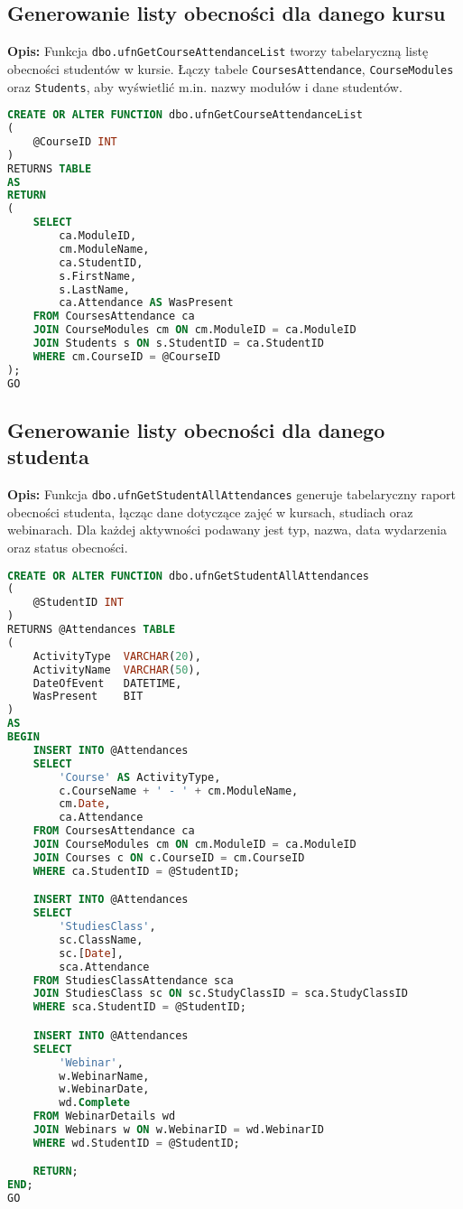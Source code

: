 \documentclass[12pt]{article}
\begin{document}
\subsection{Generowanie listy obecności dla danego kursu}
\label{sec:course_attendance_list}

\textbf{Opis:} Funkcja \texttt{dbo.ufnGetCourseAttendanceList} tworzy tabelaryczną listę obecności studentów w kursie. Łączy tabele \texttt{CoursesAttendance}, \texttt{CourseModules} oraz \texttt{Students}, aby wyświetlić m.in. nazwy modułów i dane studentów.

 
\begin{lstlisting}[language=SQL]
CREATE OR ALTER FUNCTION dbo.ufnGetCourseAttendanceList
(
    @CourseID INT
)
RETURNS TABLE
AS
RETURN
(
    SELECT 
        ca.ModuleID,
        cm.ModuleName,
        ca.StudentID,
        s.FirstName,
        s.LastName,
        ca.Attendance AS WasPresent
    FROM CoursesAttendance ca
    JOIN CourseModules cm ON cm.ModuleID = ca.ModuleID
    JOIN Students s ON s.StudentID = ca.StudentID
    WHERE cm.CourseID = @CourseID
);
GO
\end{lstlisting}
\newpage
\subsection{Generowanie listy obecności dla danego studenta}
\label{sec:student_all_attendances}

\textbf{Opis:} Funkcja \texttt{dbo.ufnGetStudentAllAttendances} generuje tabelaryczny raport obecności studenta, łącząc dane dotyczące zajęć w kursach, studiach oraz webinarach. Dla każdej aktywności podawany jest typ, nazwa, data wydarzenia oraz status obecności.

 
\begin{lstlisting}[language=SQL]
CREATE OR ALTER FUNCTION dbo.ufnGetStudentAllAttendances
(
    @StudentID INT
)
RETURNS @Attendances TABLE
(
    ActivityType  VARCHAR(20),
    ActivityName  VARCHAR(50),
    DateOfEvent   DATETIME,
    WasPresent    BIT
)
AS
BEGIN
    INSERT INTO @Attendances
    SELECT 
        'Course' AS ActivityType,
        c.CourseName + ' - ' + cm.ModuleName,
        cm.Date,
        ca.Attendance
    FROM CoursesAttendance ca
    JOIN CourseModules cm ON cm.ModuleID = ca.ModuleID
    JOIN Courses c ON c.CourseID = cm.CourseID
    WHERE ca.StudentID = @StudentID;

    INSERT INTO @Attendances
    SELECT
        'StudiesClass',
        sc.ClassName,
        sc.[Date],
        sca.Attendance
    FROM StudiesClassAttendance sca
    JOIN StudiesClass sc ON sc.StudyClassID = sca.StudyClassID
    WHERE sca.StudentID = @StudentID;

    INSERT INTO @Attendances
    SELECT
        'Webinar',
        w.WebinarName,
        w.WebinarDate,
        wd.Complete
    FROM WebinarDetails wd
    JOIN Webinars w ON w.WebinarID = wd.WebinarID
    WHERE wd.StudentID = @StudentID;

    RETURN;
END;
GO
\end{lstlisting}
\end{document}
